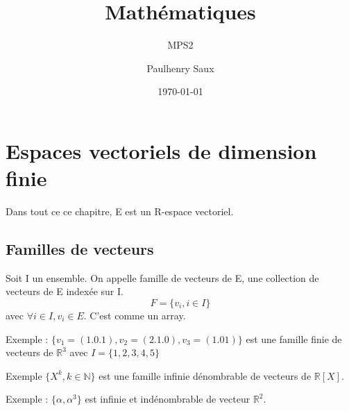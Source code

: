 \documentclass[french]{yLectureNote}
\title{Mathématiques}
\subtitle{MPS2}
\author{Paulhenry Saux}
\date{\today}
\newcommand{\N}[0]{\mathbb{N}}
\newcommand{\R}[0]{\mathbb{R}}
\begin{document}
\setcounter{chapter}{3}
	\chapter{Espaces vectoriels de dimension finie}
Dans tout ce ce chapitre, E est un R-espace vectoriel.
\section{Familles de vecteurs}
\begin{definition}
Soit I un ensemble. On appelle famille de vecteurs de E, une collection de vecteurs de E indexée sur I.
\[F = \{v_i,i\in I\}\] avec \(\forall i\in I, v_i \in E\). C'est comme un array.
\end{definition}
Exemple : \(\{v_1=(1.0.1), v_2=(2.1.0),v_3=(1.01)\}\) est une famille finie de vecteurs de \(\R^3\) avec \(I=\{1,2,3,4,5\}\)

Exemple \(\{X^k, k\in \N\}\) est une famille infinie dénombrable de vecteurs de \(\R[X]\).

Exemple : \(\{\alpha,\alpha^3\}\) est infinie et indénombrable de vecteur \(\R^2\).
\end{document}
